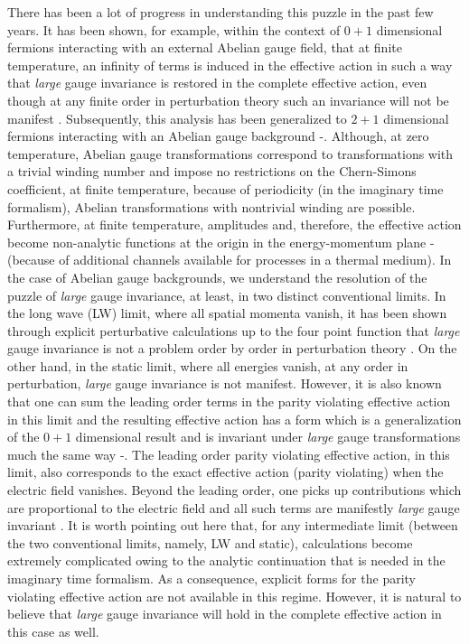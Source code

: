 \documentclass[a4paper,12pt]{article}
\begin{document}
There has been a lot of progress in understanding this puzzle in the
past few years. It has been shown, for example, within the context of
$0+1$ dimensional fermions interacting with an external Abelian gauge
field, that at finite temperature, an infinity of terms is induced in
the effective action \cite{dunne:1997yb} in such a way that {\it
  large}  gauge invariance is
restored in the complete effective action, even though at any finite
order in perturbation theory such an invariance will not be
manifest \cite{dunne:1997yb,das:1998gg}.
Subsequently, this analysis has been generalized to $2+1$
dimensional fermions interacting with an Abelian gauge
background \cite{deser:1997nv}-\cite{fosco:1997vu}.
Although, at zero temperature, Abelian gauge
transformations correspond to transformations with a trivial winding
number and impose no restrictions on the Chern-Simons coefficient, at
finite  temperature, because of periodicity (in the imaginary time
formalism), Abelian transformations with nontrivial winding are
possible. Furthermore, at finite temperature, amplitudes and,
therefore, the effective action become non-analytic functions at the
origin in the energy-momentum plane \cite{weldon:1993bv}-\cite{das:book97}
(because of additional channels
available for processes in a thermal medium). In the case of Abelian
gauge backgrounds, we
understand  the resolution of the puzzle of {\it large} gauge
invariance, at least, in two distinct conventional limits. In the long
wave (LW) limit, where all spatial momenta vanish, it has been shown
through explicit perturbative calculations up to the four point
function that  {\it large} gauge invariance is not a problem order by
order in perturbation theory \cite{Brandt:2000dd}.  On the other
hand, in the static limit, where all energies vanish, at any order in
perturbation, {\it large} gauge invariance is not manifest. However,
it is also known that one can sum the leading order terms in the
parity violating effective action in this
limit and the resulting effective action has a form
which is a generalization of the $0+1$ dimensional result and is
invariant under {\it large} gauge transformations much the same
way \cite{deser:1997nv}-\cite{fosco:1997vu}.
The leading order parity violating effective action, in this limit, also
corresponds to the exact effective action (parity violating) when the
electric field vanishes. Beyond the leading order, one picks up contributions which
are proportional to the electric field and all such terms are
manifestly {\it large} gauge invariant \cite{Brandt:2001jc}. 
It is worth pointing out here that, for any intermediate limit 
(between the two conventional limits, namely, LW and static), 
calculations become extremely complicated owing to the analytic 
continuation that is needed in the imaginary
time formalism. As a consequence, explicit forms for the parity
violating effective action are not available in this regime. However,
it is natural to believe that {\it large} gauge invariance will hold
in the complete effective action in this case as well.
\end{document}
